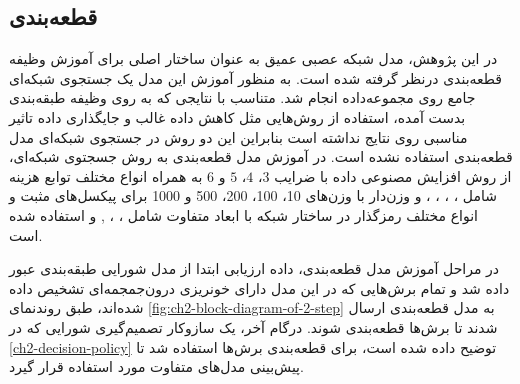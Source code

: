 \begin{table}[h]
\centering
\caption{ضرایب مورد استفاده در جستجوی شبکه‌ای}
\label{table:ch2-grid-values}
\end{table}

\subsection{قطعه‌بندی}
در این پژوهش،‌ مدل شبکه عصبی عمیق 
به عنوان ساختار اصلی برای آموزش وظیفه قطعه‌بندی درنظر گرفته شده است. به منظور آموزش این مدل یک جستجوی شبکه‌ای جامع روی مجموعه‌داده انجام شد. متناسب با نتایجی که به روی وظیفه طبقه‌بندی بدست آمده، استفاده از روش‌هایی مثل کاهش داده غالب و جایگذاری داده تاثیر مناسبی روی نتایج نداشته است بنابراین این دو روش در جستجوی شبکه‌ای مدل قطعه‌بندی استفاده نشده است. در آموزش مدل قطعه‌بندی به روش جسجتوی شبکه‌ای، از روش افزایش مصنوعی داده با ضرایب 
$3$، $4$، $5$ و $6$
به همراه انواع مختلف توابع هزینه شامل 
، ، ، ،   و
وزن‌دار با وزن‌های 10، 100،‌ 200، 500 و 1000 برای پیکسل‌های مثبت و انواع مختلف رمزگذار در ساختار شبکه 
با ابعاد متفاوت شامل 
، ، , 
و 
استفاده شده است.

در مراحل آموزش مدل قطعه‌بندی، داده ارزیابی ابتدا از مدل شورایی طبقه‌بندی عبور داده شد و تمام برش‌هایی که در این مدل دارای خونریزی درون‌جمجمه‌ای تشخیص داده شده‌اند،‌ طبق روندنمای 
\autoref{fig:ch2-block-diagram-of-2-step}
به مدل قطعه‌بندی ارسال شدند تا برش‌ها قطعه‌بندی شوند.
درگام آخر، یک سازوکار تصمیم‌گیری شورایی که در 
\autoref{ch2-decision-policy}
توضیح داده شده است، 
برای قطعه‌بندی برش‌ها استفاده شد تا پیش‌بینی مدل‌های متفاوت مورد استفاده قرار گیرد.



